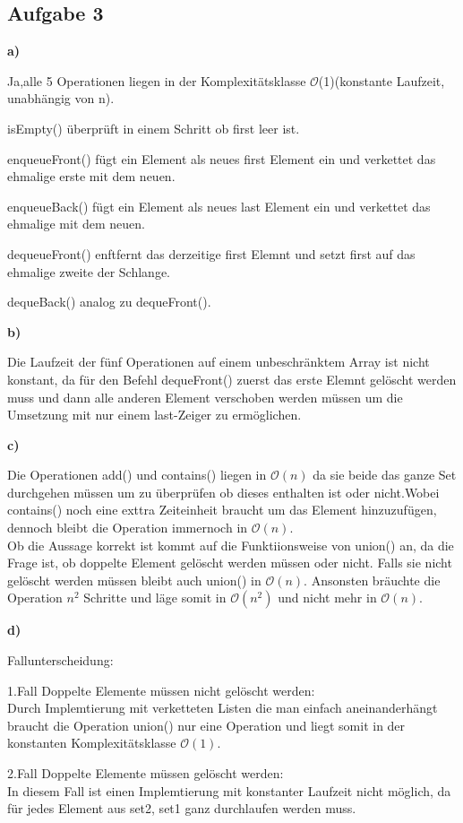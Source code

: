 \documentclass[a4paper,graphics,11pt]{article}
\newcommand{\aufgabe}[1]{\subsection*{Aufgabe #1}}
\begin{document}
\newpage

\aufgabe{3}
\textbf{a)}

Ja,alle 5 Operationen liegen in der Komplexitätsklasse $\mathcal{O}$(1)(konstante Laufzeit, unabhängig von n).

isEmpty() überprüft in einem Schritt ob first leer ist.

enqueueFront() fügt ein Element als neues first Element ein und verkettet das ehmalige erste mit dem neuen.

enqueueBack() fügt ein Element als neues last Element ein und verkettet das ehmalige mit dem neuen.

dequeueFront() enftfernt das derzeitige first Elemnt und setzt first auf das ehmalige zweite der Schlange.

dequeBack() analog zu dequeFront().

\textbf{b)}

Die Laufzeit der fünf Operationen auf einem unbeschränktem Array ist nicht konstant, da für den Befehl dequeFront() zuerst das erste Elemnt gelöscht werden muss und dann  alle anderen Element verschoben werden müssen um die Umsetzung mit nur einem last-Zeiger zu ermöglichen.

\textbf{c)}

Die Operationen add() und contains() liegen in $\mathcal{O}(n)$ da sie beide das ganze Set durchgehen müssen um zu überprüfen ob dieses enthalten ist oder nicht.Wobei contains() noch eine exttra Zeiteinheit braucht um das Element hinzuzufügen, dennoch bleibt die Operation immernoch in $\mathcal{O}(n)$.\\
Ob die Aussage korrekt ist kommt auf die Funktiionsweise von union() an, da  die Frage ist, ob doppelte Element gelöscht werden müssen oder nicht.
Falls sie nicht gelöscht werden müssen bleibt auch union() in $\mathcal{O}(n)$. Ansonsten bräuchte die Operation $ n^2$ Schritte und läge somit in $\mathcal{O}(n^2)$ und nicht mehr in $\mathcal{O}(n)$.

\textbf{d)}

Fallunterscheidung:

1.Fall Doppelte Elemente müssen nicht gelöscht werden:\\
Durch Implemtierung mit verketteten Listen die man einfach aneinanderhängt braucht die Operation union() nur eine Operation und liegt somit in der konstanten Komplexitätsklasse $\mathcal{O}(1)$.

2.Fall Doppelte Elemente müssen gelöscht werden:\\
In diesem Fall ist einen Implemtierung mit konstanter Laufzeit nicht möglich, da für jedes Element aus set2, set1 ganz durchlaufen werden muss.
\end{document}
